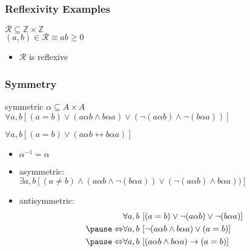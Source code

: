 \documentclass[dvipsnames]{beamer}
\begin{document}
\begin{frame}
  \frametitle{Reflexivity Examples}

  \begin{example}
    $\mathcal{R} \subseteq \mathbb{Z} \times \mathbb{Z}$\\
    $(a,b) \in \mathcal{R} \equiv ab \geq 0$

    \medskip
    \begin{itemize}
      \item $\mathcal{R}$ is reflexive
    \end{itemize}
  \end{example}
\end{frame}

\begin{frame}
  \frametitle{Symmetry}

  \begin{block}{symmetric}
    $\alpha \subseteq A \times A$\\
    $\forall a,b [(a=b) \vee (a \alpha b \wedge b \alpha a)
                        \vee (\neg(a \alpha b) \wedge \neg(b \alpha a))]$

    \pause
    $\forall a,b [(a=b) \vee (a \alpha b \leftrightarrow b \alpha a)]$
  \end{block}

  \pause
  \begin{itemize}
    \item $\alpha^{-1} = \alpha$

    \pause
    \medskip
    \item asymmetric:\\
      $\exists a,b [(a \neq b) \wedge (a \alpha b \wedge \neg(b \alpha a))
                               \vee (\neg (a \alpha b) \wedge b \alpha a))]$

    \pause
    \item antisymmetric:
    \begin{eqnarray*}
                      & \forall a,b~
                    [(a=b) \vee \neg(a \alpha b) \vee \neg(b \alpha a)]\\\pause
      \Leftrightarrow & \forall a,b~
                    [\neg(a \alpha b \wedge b \alpha a) \vee (a=b)]\\\pause
      \Leftrightarrow & \forall a,b~
                    [(a \alpha b \wedge b \alpha a) \rightarrow (a=b)]
    \end{eqnarray*}
  \end{itemize}
\end{frame}
\end{document}
